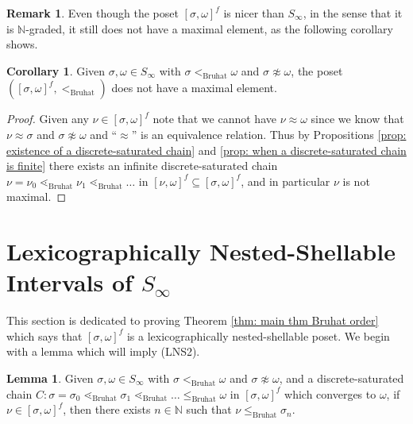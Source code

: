 \documentclass[oneside,11pt,reqno]{amsart}
\newcommand{\nn}{\ensuremath{\mathbb{N}}}
\theoremstyle{definition}
\newtheorem{remark}{Remark}
\newtheorem{proof techniques}{Proof Techniques}
\newtheorem{lemma}{Lemma}
\newtheorem{corollary}{Corollary}
\begin{document}
\begin{remark}
    Even though the poset $[\sigma , \omega]^f$ is nicer than $S_\infty$, in the sense that it is $\nn$-graded, it still does not have a maximal element, as the following corollary shows.
\end{remark}
 

\begin{corollary}\label{cor: no max element for intervals either}
Given $\sigma , \omega \in S_\infty$ with $\sigma <_\text{Bruhat} \omega$ and $\sigma \not\approx \omega$, the poset $([\sigma , \omega]^f, <_\text{Bruhat})$ does not have a maximal element. 
\end{corollary}

\begin{proof}
Given any $\nu \in [\sigma , \omega]^f$ note that we cannot have $\nu \approx \omega$ since we know that $\nu \approx \sigma$ and $\sigma \not\approx \omega$ and ``$\approx$'' is an equivalence relation. Thus by Propositions \ref{prop: existence of a discrete-saturated chain} and \ref{prop: when a discrete-saturated chain is finite} there exists an infinite discrete-saturated chain $\nu = \nu_0 \lessdot_\text{Bruhat} \nu_1 \lessdot_\text{Bruhat} \ldots$ in $[\nu , \omega]^f \subseteq [\sigma , \omega]^f$, and in particular $\nu$ is not maximal. 
\end{proof}



\section{Lexicographically Nested-Shellable Intervals of $S_\infty$}\label{sec: Lexicographically Nested-Shellable Intervals of S infty}

This section is dedicated to proving Theorem \ref{thm: main thm Bruhat order} which says that $[\sigma , \omega]^f$ is a lexicographically nested-shellable poset. We begin with a lemma which will imply (LNS2).

\begin{lemma}\label{lem: element always less than some nu n}
Given $\sigma , \omega \in S_\infty$ with $\sigma <_\text{Bruhat} \omega$ and $\sigma \not\approx \omega$, and a discrete-saturated chain $C: \sigma = \sigma_0 \lessdot_\text{Bruhat} \sigma_1 \lessdot_\text{Bruhat} \ldots \leq_\text{Bruhat} \omega$ in $[\sigma , \omega]^f$ which converges to $\omega$, if $\nu \in [\sigma , \omega]^f$, then there exists $n \in \nn$ such that $\nu \leq_\text{Bruhat} \sigma_n$. 
\end{lemma}
\end{document}
